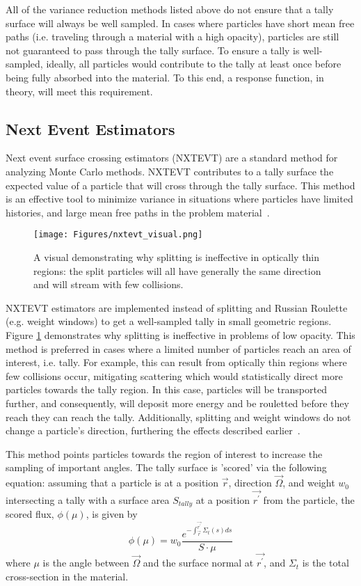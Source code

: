 \begin{chapabstract}
All of the variance reduction methods listed above do not ensure that a tally surface will always be well sampled. In cases where particles have short mean free paths (i.e. traveling through a material with a high opacity), particles are still not guaranteed to pass through the tally surface. To ensure a tally is  well-sampled, ideally, all particles would contribute to the tally at least once before being fully absorbed into the material. To this end, a response function, in theory, will meet this requirement.

\subsection{Next Event Estimators}
Next event surface crossing estimators (NXTEVT) are a standard method for analyzing Monte Carlo methods. NXTEVT contributes to a tally surface the expected value of a particle that will cross through the tally surface. This method is an effective tool to minimize variance in situations where particles have limited histories, and large mean free paths in the problem material~\cite{WD11, LL99, LL05}. 

\begin{figure} [h!]
	\centering
	\texttt{[image: Figures/nxtevt\_visual.png]}
	\caption{A visual demonstrating why splitting is ineffective in optically thin regions: the split particles will all have generally the same direction and will stream with few collisions.}
	\label{fig:nxtevt_visual}
\end{figure}

NXTEVT estimators are implemented instead of splitting and Russian Roulette (e.g. weight windows) to get a well-sampled tally in small geometric regions. Figure \ref{fig:nxtevt_visual} demonstrates why splitting is ineffective in problems of low opacity. This method is preferred in cases where a limited number of particles reach an area of interest, i.e. tally. For example, this can result from optically thin regions where few collisions occur, mitigating scattering which would statistically direct more particles towards the tally region. In this case, particles will be transported further, and consequently, will deposit more energy and be rouletted before they reach they can reach the tally. Additionally, splitting and weight windows do not change a particle's direction, furthering the effects described earlier~\cite{BF12}.

This method points particles towards the region of interest to increase the sampling of important angles. The tally surface is 'scored' via the following equation: assuming that a particle is at a position $\vec{r}$, direction $\vec{\Omega}$, and weight $w_{0}$ intersecting a tally with a surface area $S_{tally}$ at a position $\vec{r^{\prime}}$ from the particle, the scored flux, $\phi(\mu)$, is given by
\begin{equation}
\phi(\mu) = w_{0} \frac{e^{-\int_{\vec{r}}^{\vec{r^{\prime}}} \Sigma_{t}(s)ds}}{S \cdot \mu}
\end{equation}
where $\mu$ is the angle between $\vec{\Omega}$ and the surface normal at $\vec{r^{\prime}}$, and $\Sigma_{t}$ is the total cross-section in the material. 


\end{chapabstract}
